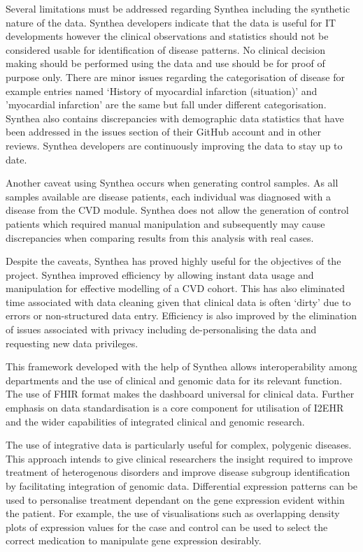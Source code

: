 \documentclass{bioinfo}
\begin{document}
\begin{Discussion}
Several limitations must be addressed regarding Synthea including the synthetic nature of the data. Synthea developers indicate that the data is useful for IT developments however the clinical observations and statistics should not be considered usable for identification of disease patterns. No clinical decision making should be performed using the data and use should be for proof of purpose only. There are minor issues regarding the categorisation of disease for example entries named `History of myocardial infarction (situation)' and 'myocardial infarction' are the same but fall under different categorisation. Synthea also contains discrepancies with demographic data statistics that have been addressed in the issues section of their GitHub account and in other reviews. Synthea developers are continuously improving the data to stay up to date. 

Another caveat using Synthea occurs when generating control samples. As all samples available are disease patients, each individual was diagnosed with a disease from the CVD module. Synthea does not allow the generation of control patients which required manual manipulation and subsequently may cause discrepancies when comparing results from this analysis with real cases. 

Despite the caveats, Synthea has proved highly useful for the objectives of the project. Synthea improved efficiency by allowing instant data usage and manipulation for effective modelling of a CVD cohort. This has also eliminated time associated with data cleaning given that clinical data is often ‘dirty’ due to errors or non-structured data entry. Efficiency is also improved by the elimination of issues associated with privacy including de-personalising the data and requesting new data privileges.

This framework developed with the help of Synthea allows interoperability among departments and the use of clinical and genomic data for its relevant function. The use of FHIR format makes the dashboard universal for clinical data. Further emphasis on data standardisation is a core component for utilisation of I2EHR and the wider capabilities of integrated clinical and genomic research.

The use of integrative data is particularly useful for complex, polygenic diseases. This approach intends to give clinical researchers the insight required to improve treatment of heterogenous disorders and improve disease subgroup identification by facilitating integration of genomic data. Differential expression patterns can be used to personalise treatment dependant on the gene expression evident within the patient. For example, the use of visualisations such as overlapping density plots of expression values for the case and control can be used to select the correct medication to manipulate gene expression desirably. 


\end{Discussion}
\end{document}
